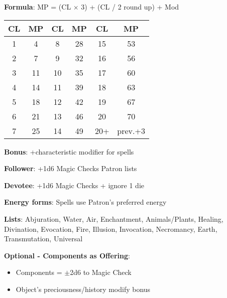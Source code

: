 \documentclass[10pt,a4paper,landscape]{article}
\begin{document}
	\begin{multicols}{2}
		
		\begin{tcolorbox}[title=UPDATED MAGIC POINTS TABLE]
			\textbf{Formula}: MP = (CL $\times$ 3) + (CL / 2 round up) + Mod
			
			\begin{tabular}{cc|cc|cc}
				\textbf{CL} & \textbf{MP} & \textbf{CL} & \textbf{MP} & \textbf{CL} & \textbf{MP} \\
				\midrule
				1 & 4 & 8 & 28 & 15 & 53 \\
				2 & 7 & 9 & 32 & 16 & 56 \\
				3 & 11 & 10 & 35 & 17 & 60 \\
				4 & 14 & 11 & 39 & 18 & 63 \\
				5 & 18 & 12 & 42 & 19 & 67 \\
				6 & 21 & 13 & 46 & 20 & 70 \\
				7 & 25 & 14 & 49 & 20+ & prev.+3 \\
			\end{tabular}
			
			\textbf{Bonus}: +characteristic modifier for spells
		\end{tcolorbox}
		
		\begin{tcolorbox}[title=PRIVILEGED MAGIC LISTS]
			\textbf{Follower}: +1d6 Magic Checks Patron lists
			
			\textbf{Devotee}: +1d6 Magic Checks + ignore 1 die
			
			\textbf{Energy forms}: Spells use Patron's preferred energy
			
			\textbf{Lists}: Abjuration, Water, Air, Enchantment, Animals/Plants, Healing, Divination, Evocation, Fire, Illusion, Invocation, Necromancy, Earth, Transmutation, Universal
			
			\medskip
			
			\textbf{Optional - Components as Offering}:
			\begin{itemize}[leftmargin=*,noitemsep]
				\item Components = $\pm$2d6 to Magic Check
				\item Object's preciousness/history modify bonus
			\end{itemize}
		\end{tcolorbox}
		
	\end{multicols}
	
\end{document}
